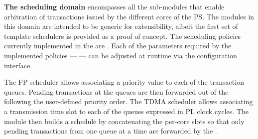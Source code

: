 \par{\bf The scheduling domain} encompasses all the sub-modules that
enable arbitration of transactions issued by the different cores of
the PS. The modules in this domain are intended to be generic for
extensibility, albeit the first set of  template schedulers is
provided as a proof of concept.  The scheduling policies currently
implemented in the \schim are .  Each of the parameters
required by the implemented policies ---  --- can be adjusted at
runtime via the configuration interface.

The FP scheduler allows associating a priority value to each of the
transaction queues. Pending transactions at the queues are then
forwarded out of the \schim following the user-defined priority
order. The TDMA scheduler allows associating a transmission time slot
to each of the queues expressed in PL clock cycles. The module then
builds a schedule by concatenating the per-core slots so that only
pending transactions from one queue at a time are forwarded by the
\schim.



